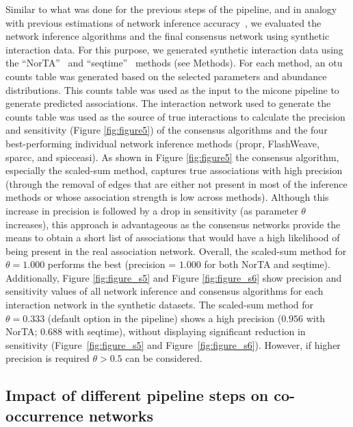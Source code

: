 \documentclass[letterpaper,12pt]{article}
\begin{document}
  Similar to what was done for the previous steps of the pipeline, and in analogy with previous estimations of network inference accuracy~\cite{Kurtz2015,Weiss2016}, we evaluated the network inference algorithms and the final consensus network using synthetic interaction data.
  For this purpose, we generated synthetic interaction data using the ``NorTA''~\cite{Kurtz2015} and ``seqtime''~\cite{faustSignaturesEcologicalProcesses2018} methods (see Methods).
  For each method, an \ac{otu} counts table was generated based on the selected parameters and abundance distributions.
  This counts table was used as the input to the \ac{micone} pipeline to generate predicted associations.
  The interaction network used to generate the counts table was used as the source of true interactions to calculate the precision and sensitivity (Figure \ref{fig:figure5}) of the consensus algorithms and the four best-performing individual network inference methods (propr, FlashWeave, \acs{sparcc}, and \acs{spieceasi}).
  As shown in Figure \ref{fig:figure5} the consensus algorithm, especially the scaled-sum method, captures true associations with high precision (through the removal of edges that are either not present in most of the inference methods or whose association strength is low across methods).
  Although this increase in precision is followed by a drop in sensitivity (as parameter $\theta$ increases), this approach is advantageous as the consensus networks provide the means to obtain a short list of associations that would have a high likelihood of being present in the real association network.
  Overall, the scaled-sum method for $\theta=1.000$ performs the best (precision = $1.000$ for both NorTA and seqtime).
  Additionally, Figure \ref{fig:figure_s5} and Figure \ref{fig:figure_s6} show precision and sensitivity values of all network inference and consensus algorithms for each interaction network in the synthetic datasets.
  The scaled-sum method for $\theta=0.333$ (default option in the pipeline) shows a high precision ($0.956$ with NorTA; $0.688$ with seqtime), without displaying significant reduction in sensitivity (Figure~\ref{fig:figure_s5} and Figure~\ref{fig:figure_s6}).
  However, if higher precision is required $\theta>0.5$ can be considered.

  \FloatBarrier

  \subsection*{Impact of different pipeline steps on co-occurrence networks}
\end{document}
